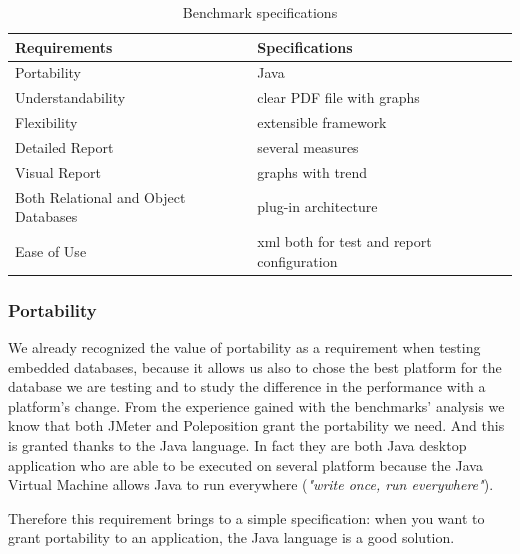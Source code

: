 \begin{table}[htp!]
	\centering
	\begin{tabular}{| p{6cm} | p{6cm} |} \hline
	
	\bfseries{Requirements} & \bfseries{Specifications} \\ \hline \hline
	
	Portability & Java \\ 
	\hline
	
	Understandability & clear PDF file with graphs \\
	\hline
	
	Flexibility & extensible framework  \\
	\hline
	
	Detailed Report & several measures \\
	\hline
	
	Visual Report & graphs with trend \\
	\hline
		
	Both Relational and Object Databases & plug-in architecture \\
	\hline
	
	Ease of Use & xml both for test and report configuration\\
	\hline		
	
	\end{tabular}
	\caption{Benchmark specifications}
	\label{benchmark-specifications-table}
\end{table}

			\subsubsection{Portability}
We already recognized the value of portability as a requirement when testing embedded databases, because it allows us also to chose the best platform for the database we are testing and to study the difference in the performance with a platform's change. From the experience gained with the benchmarks' analysis we know that both JMeter and Poleposition grant the portability we need. And this is granted thanks to the Java language. In fact they are both Java desktop application who are able to be executed on several platform because the Java Virtual Machine allows Java to run everywhere (\emph{"write once, run everywhere"}).

Therefore this requirement brings to a simple specification: when you want to grant portability to an application, the Java language is a good solution. 
		
